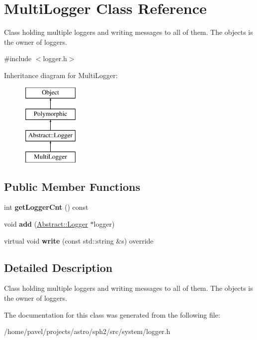 \hypertarget{classMultiLogger}{}\section{Multi\+Logger Class Reference}
\label{classMultiLogger}


Class holding multiple loggers and writing messages to all of them. The objects is the owner of loggers.  




{\ttfamily \#include $<$logger.\+h$>$}

Inheritance diagram for Multi\+Logger\+:\begin{figure}[H]
\begin{center}
\leavevmode
\includegraphics[height=4.000000cm]{classMultiLogger}
\end{center}
\end{figure}
\subsection*{Public Member Functions}
\begin{DoxyCompactItemize}
\item 
\hypertarget{classMultiLogger_a96e4c7e567d5777c2e5c5234f6475ff6}{}\label{classMultiLogger_a96e4c7e567d5777c2e5c5234f6475ff6} 
int {\bfseries get\+Logger\+Cnt} () const
\item 
\hypertarget{classMultiLogger_a3f0254d865a24ba628f95567bb52da73}{}\label{classMultiLogger_a3f0254d865a24ba628f95567bb52da73} 
void {\bfseries add} (\hyperlink{classAbstract_1_1Logger}{Abstract\+::\+Logger} $\ast$logger)
\item 
\hypertarget{classMultiLogger_a1926134f872f630aa5825dfc84888d0c}{}\label{classMultiLogger_a1926134f872f630aa5825dfc84888d0c} 
virtual void {\bfseries write} (const std\+::string \&s) override
\end{DoxyCompactItemize}


\subsection{Detailed Description}
Class holding multiple loggers and writing messages to all of them. The objects is the owner of loggers. 

The documentation for this class was generated from the following file\+:\begin{DoxyCompactItemize}
\item 
/home/pavel/projects/astro/sph2/src/system/logger.\+h\end{DoxyCompactItemize}
